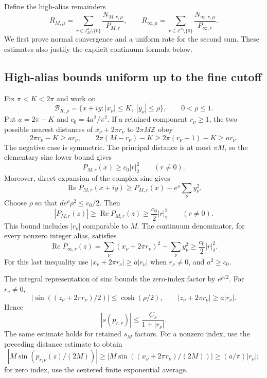 Define the high-alias remainders
\begin{equation}\label{limit-remainders}
 R_{M,\mu}=
 \sum_{r\in I_M^d\setminus\{0\}}\frac{N_{M,r,\mu}}{P_{M,r}},
 \qquad
 R_{\infty,\mu}=
 \sum_{r\in\mathbb Z^d\setminus\{0\}}
                         \frac{N_{\infty,r,\mu}}{P_{\infty,r}}.
\end{equation}
We first prove normal convergence and a uniform rate for the second
sum. These estimates also justify the explicit continuum formula below.

\subsection{High-alias bounds uniform up to the fine cutoff}

Fix $\pi<K<2\pi$ and work on
\[
 \mathcal B_{K,\rho}=
 \{x+iy:|x_\nu|\le K,\ |y_\nu|\le\rho\},
 \qquad 0<\rho\le1.
\]
Put $a=2\pi-K$ and $c_0=4a^2/\pi^2$. If a retained component
$r_\nu\ge1$, the two possible nearest distances of
$x_\nu+2\pi r_\nu$ to $2\pi M\mathbb Z$ obey
\[
 2\pi r_\nu-K\ge ar_\nu,\qquad
 2\pi(M-r_\nu)-K
 \ge2\pi(r_\nu+1)-K\ge ar_\nu.
\]
The negative case is symmetric. The principal distance is at most
$\pi M$, so the elementary sine lower bound gives
\[
 P_{M,r}(x)\ge c_0|r|_2^2\qquad(r\ne0).
\]
Moreover, direct expansion of the complex sine gives
\[
 \operatorname{Re}P_{M,r}(x+iy)
 \ge P_{M,r}(x)-e^\rho\sum_\nu y_\nu^2.
\]
Choose $\rho$ so that $de^\rho\rho^2\le c_0/2$. Then
\begin{equation}\label{limit-high-denominator}
 |P_{M,r}(z)|\ge\operatorname{Re}P_{M,r}(z)
 \ge\frac{c_0}{2}|r|_2^2\qquad(r\ne0).
\end{equation}
This bound includes $|r_\nu|$ comparable to $M$. The continuum
denominator, for every nonzero integer alias, satisfies
\begin{equation}\label{limit-high-denominator-infinite}
 \operatorname{Re}P_{\infty,r}(z)
 =\sum_\nu(x_\nu+2\pi r_\nu)^2-\sum_\nu y_\nu^2
 \ge\frac{c_0}{2}|r|_2^2.
\end{equation}
For this last inequality use $|x_\nu+2\pi r_\nu|\ge a|r_\nu|$
when $r_\nu\ne0$, and $a^2\ge c_0$.

The integral representation of sinc bounds the zero-index factor by
$e^{\rho/2}$. For $r_\nu\ne0$,
\[
 |\sin((z_\nu+2\pi r_\nu)/2)|\le\cosh(\rho/2),
 \qquad |z_\nu+2\pi r_\nu|\ge a|r_\nu|.
\]
Hence
\begin{equation}\label{limit-sinc-weight}
 |s(p_{r,\nu})|\le\frac{C_s}{1+|r_\nu|}.
\end{equation}
The same estimate holds for retained $s_M$ factors. For a nonzero
index, use the preceding distance estimate to obtain
\[
 |M\sin(p_{r,\nu}(z)/(2M))|
 \ge |M\sin((x_\nu+2\pi r_\nu)/(2M))|
 \ge(a/\pi)|r_\nu|;
\]
for zero index, use the centered finite exponential average.

